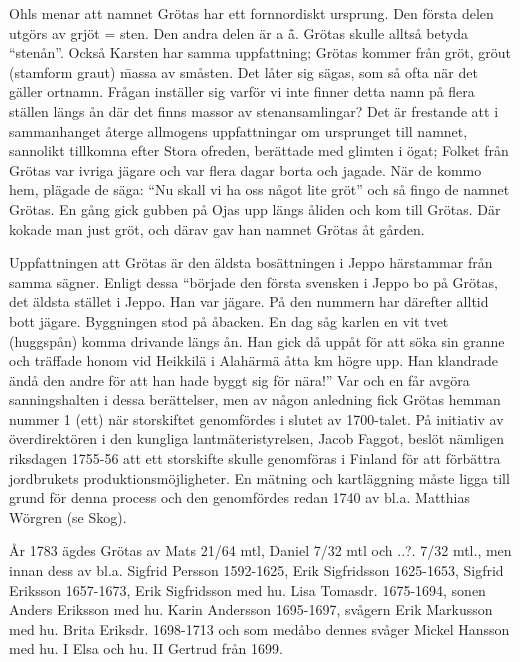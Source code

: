 
Ohls menar att namnet Grötas har ett fornnordiskt ursprung. Den första delen utgörs av grjöt = sten. Den andra delen är a \= å. Grötas skulle alltså betyda ``stenån''. Också Karsten har samma uppfattning; Grötas kommer från gröt, gröut (stamform graut) \= massa av småsten. Det låter sig sägas, som så ofta när det gäller ortnamn. Frågan inställer sig varför vi inte finner detta namn på flera ställen längs ån där det finns massor av stenansamlingar? Det är frestande att i sammanhanget återge allmogens uppfattningar om ursprunget till namnet, sannolikt tillkomna efter Stora ofreden, berättade med glimten i ögat;
 Folket från Grötas var ivriga jägare och var flera dagar borta och jagade. När de kommo hem, plägade de säga: ``Nu skall vi ha oss något lite gröt'' och så fingo de namnet Grötas.
 En gång gick gubben på Ojas upp längs åliden och kom till Grötas. Där kokade man just gröt, och därav gav han namnet Grötas åt gården.

Uppfattningen att Grötas är den äldsta bosättningen i Jeppo härstammar från samma sägner. Enligt dessa ``började den första svensken i Jeppo bo på Grötas, det äldsta stället i Jeppo. Han var jägare. På den nummern har därefter alltid bott jägare. Byggningen stod på åbacken. En dag såg karlen en vit tvet (huggspån) komma drivande längs ån. Han gick då uppåt för att söka sin granne och träffade honom vid Heikkilä i Alahärmä åtta km högre upp. Han klandrade ändå den andre för att han hade byggt sig för nära!'' Var och en får avgöra sanningshalten i dessa berättelser, men av någon anledning fick Grötas hemman nummer 1 (ett) när storskiftet genomfördes i slutet av 1700-talet. På initiativ av överdirektören i den kungliga lantmäteristyrelsen, Jacob Faggot, beslöt nämligen riksdagen 1755-56 att ett storskifte skulle genomföras i Finland för att förbättra jordbrukets produktionsmöjligheter. En mätning och kartläggning måste ligga till grund för denna process och den genomfördes redan 1740 av bl.a. Matthias Wörgren (se Skog).

År 1783 ägdes Grötas av Mats 21/64 mtl, Daniel 7/32 mtl och  ..?. 7/32 mtl., men innan dess av bl.a. Sigfrid Persson 1592-1625, Erik Sigfridsson 1625-1653, Sigfrid Eriksson  1657-1673, Erik Sigfridsson med hu. Lisa Tomasdr. 1675-1694, sonen  Anders Eriksson med hu. Karin Andersson 1695-1697, svågern Erik Markusson med hu. Brita Eriksdr. 1698-1713 och som medåbo dennes svåger Mickel Hansson med hu. I Elsa och hu. II Gertrud från 1699.

